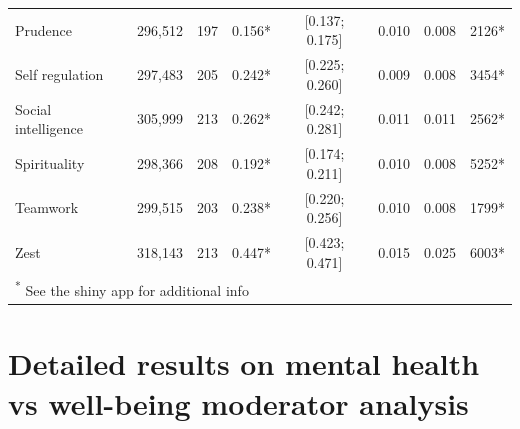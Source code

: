 \documentclass[
  man,floatsintext]{apa6}
\begin{document}
\begin{table}
\begin{tabular}[t]{lccccccc}
Prudence & 296,512 & 197 & 0.156* & {}[0.137; 0.175] & 0.010 & 0.008 & 2126*\\
Self regulation & 297,483 & 205 & 0.242* & {}[0.225; 0.260] & 0.009 & 0.008 & 3454*\\
\addlinespace
Social intelligence & 305,999 & 213 & 0.262* & {}[0.242; 0.281] & 0.011 & 0.011 & 2562*\\
Spirituality & 298,366 & 208 & 0.192* & {}[0.174; 0.211] & 0.010 & 0.008 & 5252*\\
Teamwork & 299,515 & 203 & 0.238* & {}[0.220; 0.256] & 0.010 & 0.008 & 1799*\\
Zest & 318,143 & 213 & 0.447* & {}[0.423; 0.471] & 0.015 & 0.025 & 6003*\\
\bottomrule
\multicolumn{8}{l}{\textsuperscript{*} See the shiny app for additional info}\\
\end{tabular}
\end{table}

\newpage

\hypertarget{detailed-results-on-mental-health-vs-well-being-moderator-analysis}{%
\section{Detailed results on mental health vs well-being moderator analysis}\label{detailed-results-on-mental-health-vs-well-being-moderator-analysis}}
\end{document}

